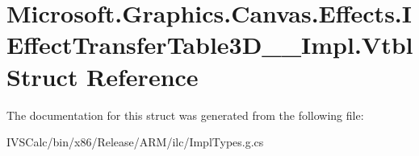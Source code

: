 \hypertarget{struct_microsoft_1_1_graphics_1_1_canvas_1_1_effects_1_1_i_effect_transfer_table3_d_____impl_1_1_vtbl}{}\section{Microsoft.\+Graphics.\+Canvas.\+Effects.\+I\+Effect\+Transfer\+Table3\+D\+\_\+\+\_\+\+Impl.\+Vtbl Struct Reference}
\label{struct_microsoft_1_1_graphics_1_1_canvas_1_1_effects_1_1_i_effect_transfer_table3_d_____impl_1_1_vtbl}


The documentation for this struct was generated from the following file\+:\begin{DoxyCompactItemize}
\item 
I\+V\+S\+Calc/bin/x86/\+Release/\+A\+R\+M/ilc/Impl\+Types.\+g.\+cs\end{DoxyCompactItemize}
